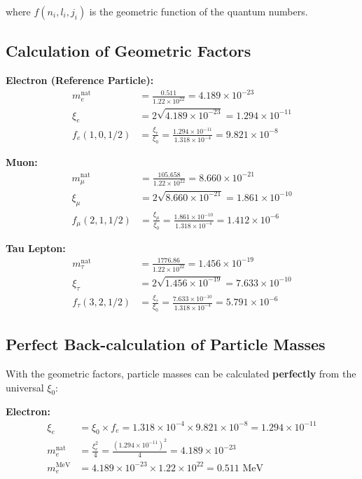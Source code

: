 \documentclass[12pt,a4paper]{article}
\begin{document}
	where $f(n_i, l_i, j_i)$ is the geometric function of the quantum numbers.
	
	\subsection{Calculation of Geometric Factors}
	
	\textbf{Electron (Reference Particle):}
	\begin{align}
		m_e^{\text{nat}} &= \frac{0.511}{1.22 \times 10^{22}} = 4.189 \times 10^{-23}\\
		\xi_e &= 2\sqrt{4.189 \times 10^{-23}} = 1.294 \times 10^{-11}\\
		f_e(1,0,1/2) &= \frac{\xi_e}{\xi_0} = \frac{1.294 \times 10^{-11}}{1.318 \times 10^{-4}} = 9.821 \times 10^{-8}
	\end{align}
	
	\textbf{Muon:}
	\begin{align}
		m_\mu^{\text{nat}} &= \frac{105.658}{1.22 \times 10^{22}} = 8.660 \times 10^{-21}\\
		\xi_\mu &= 2\sqrt{8.660 \times 10^{-21}} = 1.861 \times 10^{-10}\\
		f_\mu(2,1,1/2) &= \frac{\xi_\mu}{\xi_0} = \frac{1.861 \times 10^{-10}}{1.318 \times 10^{-4}} = 1.412 \times 10^{-6}
	\end{align}
	
	\textbf{Tau Lepton:}
	\begin{align}
		m_\tau^{\text{nat}} &= \frac{1776.86}{1.22 \times 10^{22}} = 1.456 \times 10^{-19}\\
		\xi_\tau &= 2\sqrt{1.456 \times 10^{-19}} = 7.633 \times 10^{-10}\\
		f_\tau(3,2,1/2) &= \frac{\xi_\tau}{\xi_0} = \frac{7.633 \times 10^{-10}}{1.318 \times 10^{-4}} = 5.791 \times 10^{-6}
	\end{align}
	
	\subsection{Perfect Back-calculation of Particle Masses}
	
	With the geometric factors, particle masses can be calculated \textbf{perfectly} from the universal $\xi_0$:
	
	\textbf{Electron:}
	\begin{align}
		\xi_e &= \xi_0 \times f_e = 1.318 \times 10^{-4} \times 9.821 \times 10^{-8} = 1.294 \times 10^{-11}\\
		m_e^{\text{nat}} &= \frac{\xi_e^2}{4} = \frac{(1.294 \times 10^{-11})^2}{4} = 4.189 \times 10^{-23}\\
		m_e^{\text{MeV}} &= 4.189 \times 10^{-23} \times 1.22 \times 10^{22} = 0.511 \text{ MeV}
	\end{align}
	
\end{document}
